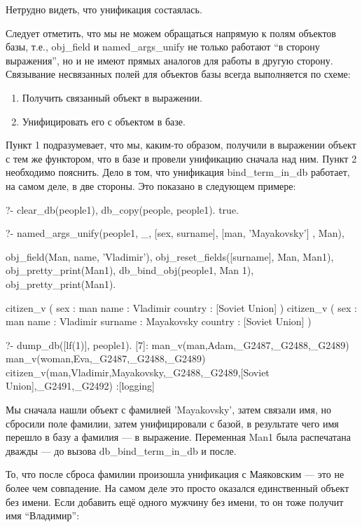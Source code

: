 \documentclass[a4paper]{book}
\def\te{т.\thinspace е.}
\def\na{named_args_unify}
\begin{document}
Нетрудно видеть, что унификация состаялась.

Следует отметить, что мы не можем обращаться напрямую к полям
объектов базы, \te, obj_field и \na{} не только работают ``в
сторону выражения'', но и не имеют прямых аналогов для работы в
другую сторону. Связывание несвязанных полей для объектов базы
всегда выполняется по схеме:

\begin{enumerate}
\item Получить связанный объект в выражении.
\item Унифицировать его с объектом в базе.
\end{enumerate}

Пункт 1 подразумевает, что мы, каким-то образом, получили в
выражении объект с тем же функтором, что в базе и провели
унификацию сначала над ним. Пункт 2 необходимо пояснить. Дело в
том, что унификация bind_term_in_db работает, на самом деле, в
две стороны. Это показано в следующем примере:

\begin{example}{}{}
?- clear_db(people1), db_copy(people, people1).
true.

?- named_args_unify(people1, _, 
      [sex, surname], [man, 'Mayakovsky'] , Man), 

   obj_field(Man, name, 'Vladimir'), 
   obj_reset_fields([surname], Man, Man1), 
   obj_pretty_print(Man1), 
   db_bind_obj(people1, Man 1), 
   obj_pretty_print(Man1).

citizen_v ( 
  sex : man 
  name : Vladimir 
  country : [Soviet Union] 
) 
citizen_v ( 
  sex : man 
  name : Vladimir 
  surname : Mayakovsky 
  country : [Soviet Union] 
) 

?- dump_db([lf(1)], people1).
[7]: man_v(man,Adam,_G2487,_G2488,_G2489) 
man_v(woman,Eva,_G2487,_G2488,_G2489) 
citizen_v(man,Vladimir,Mayakovsky,_G2488,_G2489,[Soviet Union],_G2491,_G2492)                                                        
 :[logging]
\end{example}

Мы сначала нашли объект с фамилией 'Mayakovsky', затем связали
имя, но сбросили поле фамилии, затем унифицировали с базой, в
результате чего имя перешло в базу а фамилия --- в
выражение. Переменная Man1 была распечатана дважды --- до вызова
db_bind_term_in_db и после.

То, что после сброса фамилии произошла унификация с Маяковским
--- это не более чем совпадение. На самом деле это просто
оказался единственный объект без имени. Если добавить ещё одного
мужчину без имени, то он тоже получит имя ``Владимир'':
\end{document}
